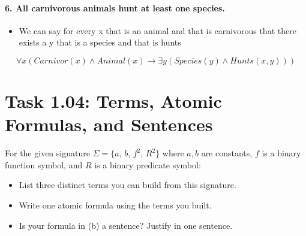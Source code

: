 \documentclass[11pt,a4paper]{article}
\newenvironment{solution}{%
    \begin{tcolorbox}[
        breakable,
        colback=green!4,
        colframe=green!50!black,
        fonttitle=\bfseries,
        title={ Solution},
        left=6pt, right=6pt, top=4pt, bottom=4pt
    ]%
    }{%
    \end{tcolorbox}%
}
\begin{document}
\begin{solution}
        \paragraph{6. All carnivorous animals hunt at least one species.}
        \begin{itemize}
            \item We can say for every x that is an animal and that is carnivorous that there exists a y that is a species and that is hunts
        \end{itemize}
        \[
            \forall x (
            Carnivor(x) \land Animal(x) \rightarrow
            \exists y(
            Species(y) \land Hunts(x,y)
            )
            )
        \]
    \end{solution}

    \section*{Task 1.04: Terms, Atomic Formulas, and Sentences}

    For the given signature $\Sigma = \{a,\, b,\, f^2,\, R^2\}$ where $a,b$ are constants, $f$ is a binary function symbol, and $R$ is a binary predicate symbol:

    \begin{itemize}[itemindent=1em]
        \item List three distinct terms you can build from this signature.
        \item Write one atomic formula using the terms you built.
        \item Is your formula in (b) a sentence? Justify in one sentence.
    \end{itemize}
\end{document}
